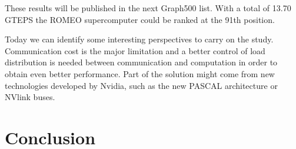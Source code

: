 These results will be published in the next Graph500 list. With a total of 13.70 GTEPS the ROMEO supercomputer could be ranked at the 91th position. 

Today we can identify some interesting perspectives to carry on the study. 
Communication cost is the major limitation and a better control of load distribution is needed between communication and computation in order to obtain even better performance.
Part of the solution might come from new technologies developed by Nvidia, such as the new PASCAL architecture or NVlink buses.
 
\section{Conclusion}